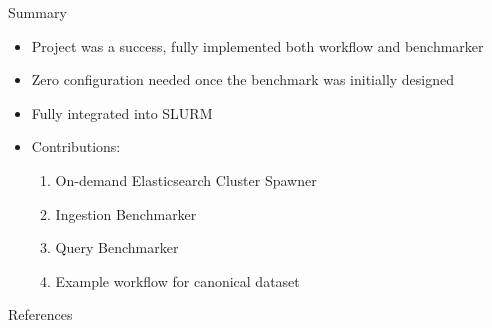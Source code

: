 \documentclass[compress,aspectratio=169]{beamer}
\begin{document}
	\begin{frame}{Summary}
		\label{pg:lastpage} %
    \begin{itemize}
      \item Project was a success, fully implemented both workflow and benchmarker
      \item Zero configuration needed once the benchmark was initially designed
      \item Fully integrated into SLURM
      \item Contributions:
        \begin{enumerate}
          \item On-demand Elasticsearch Cluster Spawner
          \item Ingestion Benchmarker
          \item Query Benchmarker
          \item Example workflow for canonical dataset
        \end{enumerate}
    \end{itemize}
	\end{frame}

	\begin{frame}{References}
		\renewcommand*{\bibfont}{\normalfont\scriptsize}
		\printbibliography[heading=none]
	\end{frame}
\end{document}

